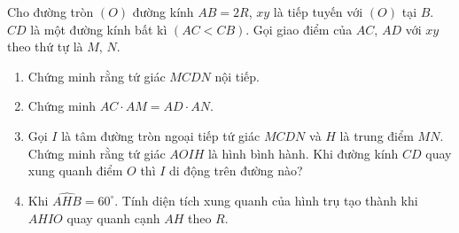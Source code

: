 \begin{ex}%
Cho đường tròn $(O)$ đường kính $AB=2R$, $xy$ là tiếp tuyến với $(O)$ tại $B$. $CD$ là một đường kính bất kì $(AC<CB)$. Gọi giao điểm của $AC$, $AD$ với $xy$ theo thứ tự là $M$, $N$.
\begin{enumerate}
\item Chứng minh rằng tứ giác $MCDN$ nội tiếp.
\item Chứng minh $AC \cdot AM=AD \cdot AN$.
\item Gọi $I$ là tâm đường tròn ngoại tiếp tứ giác $MCDN$ và $H$ là trung điểm $MN$. Chứng minh rằng tứ giác $AOIH$ là hình bình hành. Khi đường kính $CD$ quay xung quanh điểm $O$ thì $I$ di động trên đường nào?
\item Khi $\widehat{AHB}=60^{\circ}$. Tính diện tích xung quanh của hình trụ tạo thành khi $AHIO$ quay quanh cạnh $AH$ theo $R$. 
\end{enumerate}
	\loigiai
	{
\begin{center}
\end{center}	
	
}
\end{ex}
